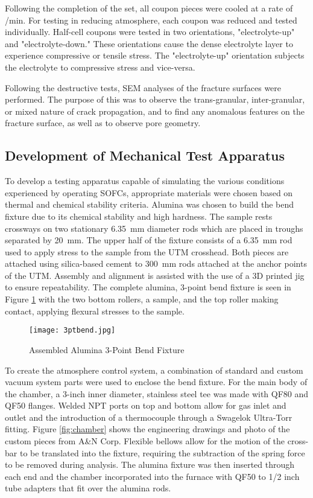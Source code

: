     Following the completion of the set, all coupon pieces were cooled at a rate of /min.
    For testing in reducing atmosphere, each coupon was reduced and tested individually.
    Half-cell coupons were tested in two orientations, "electrolyte-up" and "electrolyte-down." These orientations cause the dense electrolyte layer to experience compressive or tensile stress.
    The "electrolyte-up" orientation subjects the electrolyte to compressive stress and vice-versa.

    Following the destructive tests, SEM analyses of the fracture surfaces were performed.
    The purpose of this was to observe the trans-granular,
    inter-granular, or mixed nature of crack propagation, and to find any anomalous features on the fracture surface, as well as to observe pore geometry.

    \subsection{Development of Mechanical Test Apparatus}
        To develop a testing apparatus capable of simulating the various conditions experienced by operating SOFCs, appropriate materials were chosen based on thermal and chemical stability criteria.
        Alumina was chosen to build the bend fixture due to its chemical stability and high hardness.
        The sample rests crossways on two stationary \SI{6.35}{\milli\meter} diameter rods which are placed in troughs separated by \SI{20}{\milli\meter}.
        The upper half of the fixture consists of a \SI{6.35}{\milli\meter} rod used to apply stress to the sample from the UTM crosshead.
        Both pieces are attached using silica-based cement to \SI{300}{\milli\meter} rods attached at the anchor points of the UTM.
        Assembly and alignment is assisted with the use of a 3D printed jig to ensure repeatability.
        The complete alumina, 3-point bend fixture is seen in Figure \ref{fig:3ptbend} with the two bottom rollers, a sample, and the top roller making contact, applying flexural stresses to the sample.

        \begin{figure}
            \texttt{[image: 3ptbend.jpg]}
            \caption{Assembled Alumina 3-Point Bend Fixture}
            \label{fig:3ptbend}
        \end{figure}

        To create the atmosphere control system, a combination of standard and custom vacuum system parts were used to enclose the bend fixture.
        For the main body of the chamber, a 3-inch inner diameter, stainless steel tee was made with QF80 and QF50 flanges.
        Welded NPT ports on top and bottom allow for gas inlet and outlet and the introduction of a thermocouple through a Swagelok Ultra-Torr fitting.
        Figure \ref{fig:chamber} shows the engineering drawings and photo of the custom pieces from A\&N Corp.
        Flexible bellows allow for the motion of the cross-bar to be translated into the fixture, requiring the subtraction of the spring force to be removed during analysis.
        The alumina fixture was then inserted through each end and the chamber incorporated into the furnace with QF50 to 1/2 inch tube adapters that fit over the alumina rods.

